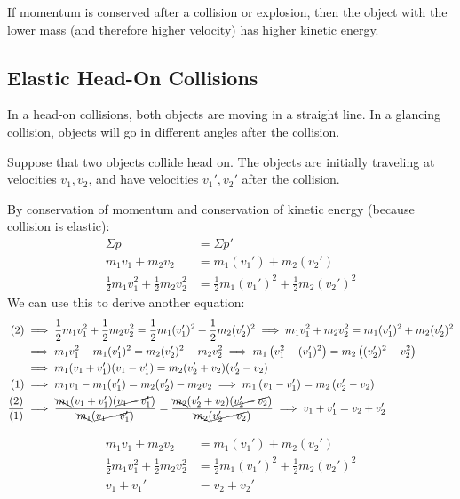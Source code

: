\documentclass{article}
\newcommand{\definition}[1]{\begin{tcolorbox}[colback=red!5!white,colframe=red!75!black,parbox=false] #1 \end{tcolorbox}}
\newcommand{\theorem}[2]{\begin{tcolorbox}[title={#1},colback=blue!5!white,colframe=blue!75!black,parbox=false] #2 \end{tcolorbox}}
\begin{document}
\theorem*{If momentum is conserved after a collision or explosion, then the object with the lower mass (and therefore higher velocity) has higher kinetic energy.}

\subsection{Elastic Head-On Collisions}

\definition{In a head-on collisions, both objects are moving in a straight line. In a glancing collision, objects will go in different angles after the collision.}

Suppose that two objects collide head on. The objects are initially traveling at velocities $v_1,v_2$, and have velocities $v_1',v_2'$ after the collision.

By conservation of momentum and conservation of kinetic energy (because collision is elastic):
\begin{align*}
	\Sigma p&=\Sigma p' \\
	m_1v_1+m_2v_2&=m_1(v_1')+m_2(v_2') \tag{1} \\
	\frac12m_1v_1^2+\frac12m_2v_2^2&=\frac12m_1(v_1')^2+\frac12m_2(v_2')^2 \tag{2}
\end{align*}
We can use this to derive another equation:
\begin{align*}
	(2)
	&\implies \frac12m_1v_1^2+\frac12m_2v_2^2=\frac12m_1(v_1')^2+\frac12m_2(v_2')^2
	\implies m_1v_1^2+m_2v_2^2=m_1(v_1')^2+m_2(v_2')^2 \\
	&\implies m_1 v_1^2-m_1(v_1')^2=m_2(v_2')^2-m_2v_2^2
	\implies m_1 \left( v_1^2-(v_1')^2 \right)=m_2 \left( (v_2')^2-v_2^2 \right) \\
	&\implies m_1(v_1+v_1')(v_1-v_1')=m_2(v_2'+v_2)(v_2'-v_2) \\
	(1)
	&\implies m_1v_1-m_1(v_1')=m_2(v_2')-m_2v_2
	\implies m_1 \left( v_1-v_1' \right)=m_2 \left( v_2'-v_2 \right) \\
	\frac{(2)}{(1)}
	&\implies \frac{\bcancel{m_1}(v_1+v_1')(\cancel{v_1-v_1'})}{\bcancel{m_1}(\cancel{v_1-v_1'})}=\frac{\bcancel{m_2}(v_2'+v_2)(\cancel{v_2'-v_2})}{\bcancel{m_2}(\cancel{v_2'-v_2})}
	\implies v_1+v_1'=v_2+v_2'
\end{align*}

\theorem{Equations for a head-on elastic collision}{
	\begin{align*}
		m_1v_1+m_2v_2&=m_1(v_1')+m_2(v_2') \tag{Conservation of Momentum} \\
		\frac12m_1v_1^2+\frac12m_2v_2^2&=\frac12m_1(v_1')^2+\frac12m_2(v_2')^2 \tag{Conservation of Kinetic Energy} \\
		v_1+v_1'&=v_2+v_2'
	\end{align*}
}
\end{document}
